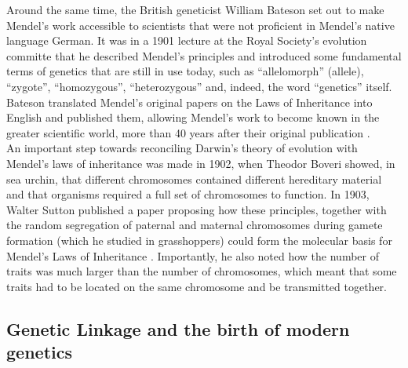 Around the same time, the British geneticist William Bateson set out to make Mendel’s work accessible to scientists that were not proficient in Mendel’s native language German.
It was in a 1901 lecture at the Royal Society's evolution committe that he described Mendel's principles and introduced some fundamental terms of genetics that are still in use today, such as “allelomorph” (allele), “zygote”, “homozygous”, “heterozygous” and, indeed, the word “genetics” itself.
Bateson translated Mendel’s original papers on the Laws of Inheritance into English and published them, allowing Mendel’s work to become known in the greater scientific world, more than 40 years after their original publication \cite{bateson2013mendel}.\\ 

An important step towards reconciling Darwin’s theory of evolution with Mendel’s laws of inheritance was made in 1902, when Theodor Boveri showed, in sea urchin, that different chromosomes contained different hereditary material and that organisms required a full set of chromosomes to function. 
In 1903, Walter Sutton published a paper proposing how these principles, together with the random segregation of paternal and maternal chromosomes during gamete formation (which he studied in grasshoppers) could form the molecular basis for Mendel’s Laws of Inheritance \cite{sutton1903chromosomes}. 
Importantly, he also noted how the number of traits was much larger than the number of chromosomes, which meant that some traits had to be located on the same chromosome and be transmitted together.

\subsection{Genetic Linkage and the birth of modern genetics} %

